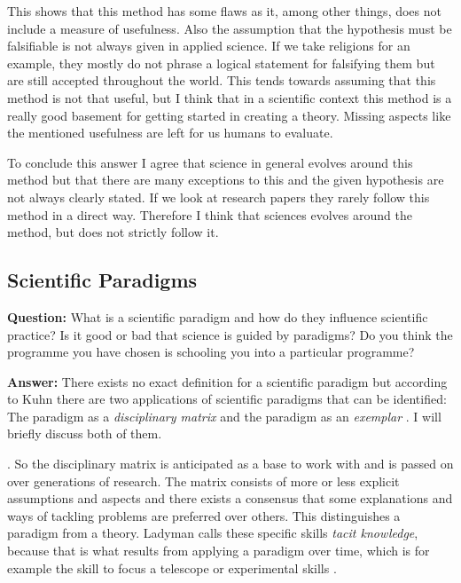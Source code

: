 \documentclass[11pt]{scrartcl}
\begin{document}
This shows that this method has some flaws as it, among other things, does not include a measure of usefulness. Also the assumption that the hypothesis must be falsifiable is not always given in applied science. If we take religions for an example, they mostly do not phrase a logical statement for falsifying them but are still accepted throughout the world. This tends towards assuming that  this method is not that useful, but I think that in a scientific context this method is a really good basement for getting started in creating a theory. Missing aspects like the mentioned usefulness are left for us humans to evaluate.

To conclude this answer I agree that science in general evolves around this method but that there are many exceptions to this and the given hypothesis are not always clearly stated. If we look at research papers they rarely follow this method in a direct way. Therefore I think that sciences evolves around the method, but does not strictly follow it.

\subsection{Scientific Paradigms}

\textbf{Question:} What is a scientific paradigm and how do they influence scientific practice? Is it good or bad that science is guided by paradigms? Do you think the programme you have chosen is schooling you into a particular programme?

\bigbreak

\textbf{Answer:} There exists no exact definition for a scientific paradigm but according to Kuhn there are two applications of scientific paradigms that can be identified: The paradigm as a \textit{disciplinary matrix} and the paradigm as an \textit{exemplar} \cite{ladyman}. I will briefly discuss both of them.

 \cite[p. 98]{ladyman}. So the disciplinary matrix is anticipated as a base to work with and is passed on over generations of research. The matrix consists of more or less explicit assumptions and aspects and there exists a consensus that some explanations and ways of tackling problems are preferred over others. This distinguishes a paradigm from a theory. Ladyman calls these specific skills \textit{tacit knowledge}, because that is what results from applying a paradigm over time, which is for example the skill to focus a telescope or experimental skills \cite[p. 99]{ladyman}.
\end{document}
